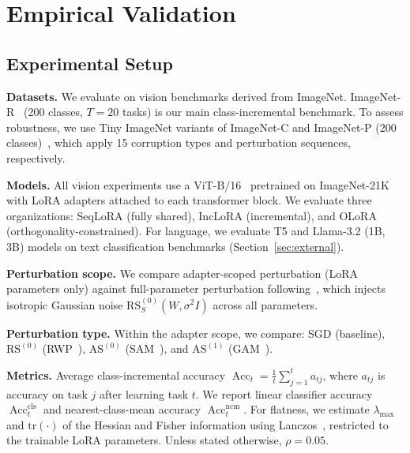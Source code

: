 \section{Empirical Validation}
\label{sec:experiments}

\subsection{Experimental Setup}

\noindent\textbf{Datasets.}
We evaluate on vision benchmarks derived from ImageNet.
ImageNet-R~\citep{ImagenetR_Hendrycks_2021_ICCV} (200 classes, $T=20$ tasks) is our main class-incremental benchmark.
To assess robustness, we use Tiny ImageNet variants of ImageNet-C and ImageNet-P (200 classes)~\citep{hendrycks2018benchmarking}, which apply 15 corruption types and perturbation sequences, respectively.

\noindent\textbf{Models.}
All vision experiments use a ViT-B/16~\citep{dosovitskiy2020image} pretrained on ImageNet-21K with LoRA adapters attached to each transformer block.
We evaluate three organizations: SeqLoRA (fully shared), IncLoRA (incremental), and OLoRA~\citep{wang2023orthogonal} (orthogonality-constrained).
For language, we evaluate T5 and Llama-3.2 (1B, 3B) models on text classification benchmarks (Section~\ref{sec:external}).

\noindent\textbf{Perturbation scope.}
We compare adapter-scoped perturbation (LoRA parameters only) against full-parameter perturbation following~\citet{li2024flatlora}, which injects isotropic Gaussian noise $\mathrm{RS}_S^{(0)}(W, \sigma^2 I)$ across all parameters.

\noindent\textbf{Perturbation type.}
Within the adapter scope, we compare: SGD (baseline), $\mathrm{RS}^{(0)}$ (RWP~\citep{pmlr-v151-bisla22a}), $\mathrm{AS}^{(0)}$ (SAM~\citep{foretSharpnessAwareMinimizationEfficiently2021}), and $\mathrm{AS}^{(1)}$ (GAM~\citep{Zhang_GAM}).

\noindent\textbf{Metrics.}
Average class-incremental accuracy $\operatorname{Acc}_t = \frac{1}{t}\sum_{j=1}^t a_{tj}$, where $a_{tj}$ is accuracy on task $j$ after learning task $t$.
We report linear classifier accuracy $\operatorname{Acc}_t^{\mathrm{cls}}$ and nearest-class-mean accuracy $\operatorname{Acc}_t^{\mathrm{ncm}}$.
For flatness, we estimate $\lambda_{\max}$ and $\mathrm{tr}(\cdot)$ of the Hessian and Fisher information using Lanczos~\citep{ghorbaniInvestigationNeuralNet2019}, restricted to the trainable LoRA parameters.
Unless stated otherwise, $\rho = 0.05$.

